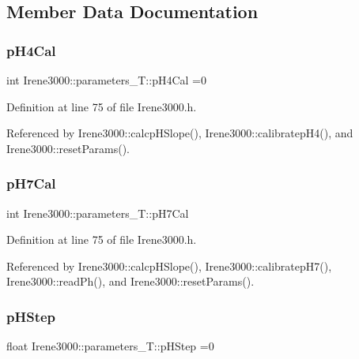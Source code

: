 \subsection{Member Data Documentation}
\mbox{\label{structIrene3000_1_1parameters__T_a1144de6fb54eb3e1dd2a3d8c2afc97dc}} 
\subsubsection{\texorpdfstring{p\+H4\+Cal}{pH4Cal}}
{\footnotesize\ttfamily int Irene3000\+::parameters\+\_\+\+T\+::p\+H4\+Cal =0}



Definition at line 75 of file Irene3000.\+h.



Referenced by Irene3000\+::calcp\+H\+Slope(), Irene3000\+::calibratep\+H4(), and Irene3000\+::reset\+Params().

\mbox{\label{structIrene3000_1_1parameters__T_a21265466a570d84bff914f26d2f7a03e}} 
\subsubsection{\texorpdfstring{p\+H7\+Cal}{pH7Cal}}
{\footnotesize\ttfamily int Irene3000\+::parameters\+\_\+\+T\+::p\+H7\+Cal}



Definition at line 75 of file Irene3000.\+h.



Referenced by Irene3000\+::calcp\+H\+Slope(), Irene3000\+::calibratep\+H7(), Irene3000\+::read\+Ph(), and Irene3000\+::reset\+Params().

\mbox{\label{structIrene3000_1_1parameters__T_a61cfcc2539d5f630e9071f3753aba9fe}} 
\subsubsection{\texorpdfstring{p\+H\+Step}{pHStep}}
{\footnotesize\ttfamily float Irene3000\+::parameters\+\_\+\+T\+::p\+H\+Step =0}



